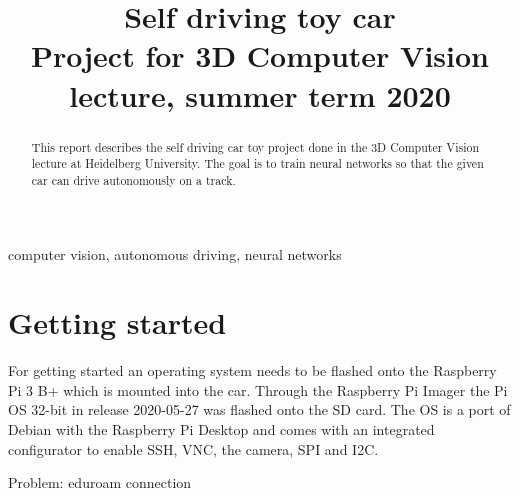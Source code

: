 \documentclass[conference]{IEEEtran}
\begin{document}
\title{Self driving toy car\\
{\footnotesize Project for 3D Computer Vision lecture, summer term 2020}
}

\author{
\and
{}
\and
{}
\and
{}
}

\maketitle

\begin{abstract}
This report describes the self driving car toy project done in the 3D Computer Vision lecture at Heidelberg University.
The goal is to train neural networks so that the given car can drive autonomously on a track.
\end{abstract}

\begin{IEEEkeywords}
computer vision, autonomous driving, neural networks
\end{IEEEkeywords}

\section{Getting started}
For getting started an operating system needs to be flashed onto the Raspberry Pi 3 B+ which is mounted into the car.
Through the Raspberry Pi Imager the Pi OS 32-bit in release 2020-05-27 was flashed onto the SD card.
The OS is a port of Debian with the Raspberry Pi Desktop and comes with an integrated configurator to enable SSH, VNC, the camera, SPI and I2C.

Problem: eduroam connection
\end{document}
